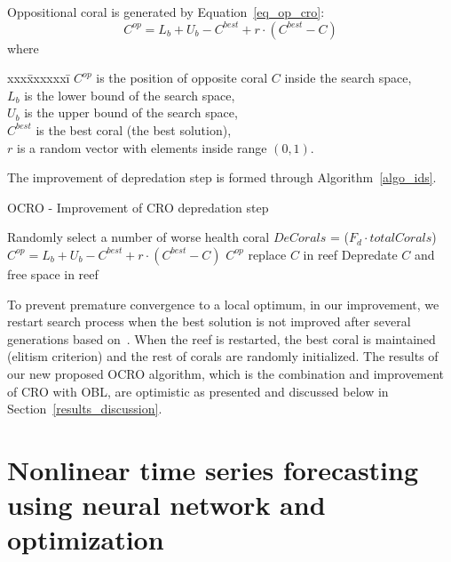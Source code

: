 \documentclass[smallcondensed, natbib]{svjour3}     %
\begin{document}
Oppositional coral is generated by Equation~\ref{eq_op_cro}:
\begin{equation} \label{eq_op_cro}
	C^{op} = L_b + U_b - C^{best} + r \cdot ( C^{best} - C)
\end{equation}
where 
\begin{tabbing}
	xxx\=xxxxxxi\=\kill
	\>	$C^{op}$ 		\>	is the position of opposite coral $C$ inside the search space, \\
	\>	$L_b$ 		\>	is the lower bound of the search space,	\\
	\>	$U_b$ 		\>	is the upper bound of the search space,	\\ 
	\>	$C^{best}$ 	\>	is the best coral (the best solution), 		\\
	\>	$r$ 			\>	is a random vector with elements inside range $(0,1)$. 
\end{tabbing}

The improvement of depredation step is formed through Algorithm~\ref{algo_ids}.
\begin{algorithm}
\caption{OCRO - Improvement of CRO depredation step }\label{algo_ids}
\begin{algorithmic}[1]
   \State Randomly select a number of worse health coral $DeCorals$ = ($F_{d} \cdot totalCorals$)
       \State $C^{op} = L_b + U_b - C^{best} + r \cdot ( C^{best} - C )$
           \State $C^{op}$ replace $C$ in reef
       \Else
           \State Depredate $C$ and free space in reef
       \EndIf
    \EndFor
\end{algorithmic}
\end{algorithm}
To prevent premature convergence to a local optimum, in our improvement, we restart search process when the best solution is not improved after several generations based on~\citep{ref_Salcedo}. When the reef is restarted, the best coral is maintained (elitism criterion) and the rest of corals are randomly initialized. The results of our new proposed OCRO algorithm, which is the combination and improvement of CRO with OBL, are optimistic as presented and discussed below in Section~\ref{results_discussion}.

\section{Nonlinear time series forecasting using neural network and optimization}
\label{mlnn}
\end{document}
